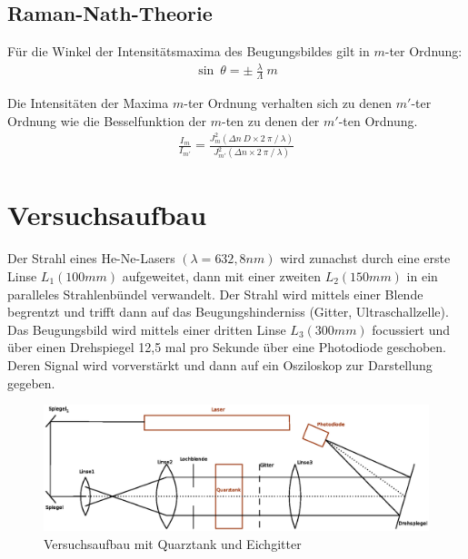 \documentclass[12pt]{article}
\begin{document}
\subsection{Raman-Nath-Theorie}
Für die Winkel der Intensitätsmaxima des Beugungsbildes gilt in $m$-ter Ordnung:
\begin{align}
 \sin~\theta = \pm~\frac{\lambda}{\Lambda}~m
\end{align}

Die Intensitäten der Maxima $m$-ter Ordnung verhalten sich zu denen $m'$-ter Ordnung wie die Besselfunktion der $m$-ten zu denen der $m'$-ten Ordnung.
\begin{align}
 \frac{I_m}{I_{m'}} = \frac{J^2_m(\Delta n~D \times 2~\pi~/~\lambda)}{J^2_{m'}(\Delta n \times 2~\pi~/~\lambda)}
\end{align}

\newpage

\section{Versuchsaufbau}
Der Strahl eines He-Ne-Lasers $(\lambda = 632,8nm)$ wird zunachst durch eine erste Linse $L_1(100mm)$ 
aufgeweitet, dann mit einer zweiten $L_2(150mm)$ in ein paralleles Strahlenbündel verwandelt. Der Strahl
 wird mittels einer Blende begrentzt und trifft dann auf das Beugungshinderniss (Gitter, Ultraschallzelle). 
Das Beugungsbild wird mittels einer dritten Linse $L_3(300mm)$ focussiert und über einen Drehspiegel 12,5 mal
 pro Sekunde über eine Photodiode geschoben. Deren Signal wird vorverstärkt und dann auf ein Osziloskop zur
 Darstellung gegeben.

\begin{figure}[H]  
\centering
\includegraphics[width=0.99\linewidth]{pictures/aufbau.eps}
\caption{Versuchsaufbau mit Quarztank und Eichgitter}
\end{figure}
\end{document}
